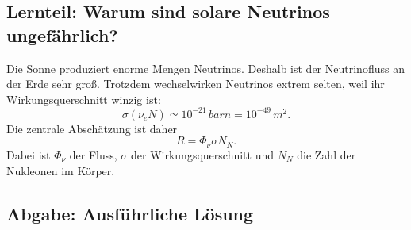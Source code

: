 \documentclass[11pt,a4paper]{scrartcl}
\theoremstyle{definition}
\theoremstyle{plain}
\theoremstyle{remark}
\begin{document}
\subsection{Lernteil: Warum sind solare Neutrinos ungefährlich?}

\begin{learningbox}
Die Sonne produziert enorme Mengen Neutrinos. Deshalb ist der Neutrinofluss an der Erde sehr groß. Trotzdem wechselwirken Neutrinos extrem selten, weil ihr Wirkungsquerschnitt winzig ist:
\[
    \sigma(\nu_eN)\simeq10^{-21}\,\si{barn}=10^{-49}\,\si{m^2}.
\]
Die zentrale Abschätzung ist daher
\[
    R=\Phi_\nu\sigma N_N.
\]
Dabei ist $\Phi_\nu$ der Fluss, $\sigma$ der Wirkungsquerschnitt und $N_N$ die Zahl der Nukleonen im Körper.
\end{learningbox}

\subsection{Abgabe: Ausführliche Lösung}
\end{document}
